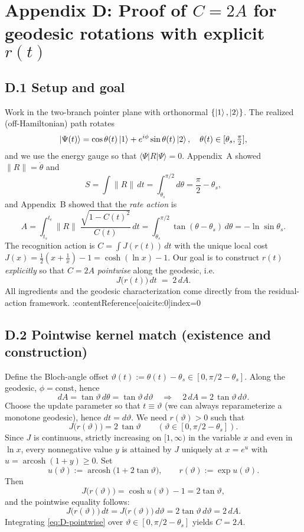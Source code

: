 \documentclass[11pt,letterpaper]{article}
\begin{document}
\section*{Appendix D: Proof of \texorpdfstring{$C=2A$}{C=2A} for geodesic rotations with explicit \(r(t)\)}

\subsection*{D.1 Setup and goal}

Work in the two-branch pointer plane with orthonormal \(\{\ket{1},\ket{2}\}\). The realized (off-Hamiltonian) path rotates
\[
\ket{\Psi(t)}=\cos\theta(t)\ket{1}+e^{i\phi}\sin\theta(t)\ket{2},
\quad \theta(t)\in[\theta_s,\tfrac{\pi}{2}],
\]
and we use the energy gauge so that \(\langle\Psi|R|\Psi\rangle=0\). Appendix~A showed \(\|R\|=\dot\theta\) and
\[
S=\int\!\|R\|\,dt=\int_{\theta_s}^{\pi/2}\!d\theta=\frac{\pi}{2}-\theta_s,
\]
and Appendix~B showed that the \emph{rate action} is
\[
A=\int_{t_s}^{t_e}\!\|R\|\;\frac{\sqrt{1-C(t)^2}}{C(t)}\,dt
= \int_{\theta_s}^{\pi/2}\!\tan(\theta-\theta_s)\,d\theta
= -\ln\sin\theta_s.
\]
The recognition action is \(C=\int J(r(t))\,dt\) with the unique local cost \(J(x)=\tfrac12(x+\tfrac1x)-1=\cosh(\ln x)-1\).
Our goal is to construct \(r(t)\) \emph{explicitly} so that \(C=2A\) \emph{pointwise} along the geodesic, i.e.
\[
J\!\bigl(r(t)\bigr)\,dt\;=\;2\,dA.
\]
All ingredients and the geodesic characterization come directly from the residual-action framework. :contentReference[oaicite:0]{index=0}

\subsection*{D.2 Pointwise kernel match (existence and construction)}

Define the Bloch-angle offset \(\vartheta(t):=\theta(t)-\theta_s\in[0,\pi/2-\theta_s]\). Along the geodesic, \(\phi=\mathrm{const}\), hence
\[
dA=\tan\vartheta\,d\theta=\tan\vartheta\,d\vartheta
\quad\Rightarrow\quad
2\,dA=2\,\tan\vartheta\,d\vartheta.
\]
Choose the update parameter so that \(t\equiv\vartheta\) (we can always reparameterize a monotone geodesic), hence \(dt=d\vartheta\). We need \(r(\vartheta)>0\) such that
\[
J\!\bigl(r(\vartheta)\bigr)=2\,\tan\vartheta\qquad(\vartheta\in[0,\pi/2-\theta_s]).
\]
Since \(J\) is continuous, strictly increasing on \([1,\infty)\) in the variable \(x\) and even in \(\ln x\), every nonnegative value \(y\) is attained by \(J\) uniquely at \(x=e^{u}\) with \(u=\operatorname{arcosh}(1+y)\ge 0\). Set
\begin{equation}
u(\vartheta):=\operatorname{arcosh}\!\bigl(1+2\tan\vartheta\bigr),\qquad
r(\vartheta):=\exp u(\vartheta).
\label{eq:D-r-profile}
\end{equation}
Then
\[
J\!\bigl(r(\vartheta)\bigr)=\cosh u(\vartheta)-1=2\tan\vartheta,
\]
and the pointwise equality follows:
\begin{equation}
J\!\bigl(r(\vartheta)\bigr)\,dt
=
J\!\bigl(r(\vartheta)\bigr)\,d\vartheta
=
2\tan\vartheta\,d\vartheta
=
2\,dA.
\label{eq:D-pointwise}
\end{equation}
Integrating \eqref{eq:D-pointwise} over \(\vartheta\in[0,\pi/2-\theta_s]\) yields \(C=2A\).
\end{document}
